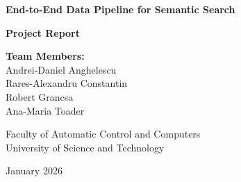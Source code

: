 \documentclass[12pt, a4paper]{article}
\begin{document}
\begin{titlepage}
    \centering
    \vspace*{1cm}
    
    \Huge
    \textbf{End-to-End Data Pipeline for Semantic Search}
    
    \vspace{2cm}
    
    \Large
    \textbf{Project Report}
    
    \vspace{2cm}
    
    \large
    \textbf{Team Members:} \\
    \vspace{0.5cm}
    Andrei-Daniel Anghelescu \\
    Rares-Alexandru Constantin \\
    Robert Grancsa \\
    Ana-Maria Toader
    
    \vfill
    
    \Large
    Faculty of Automatic Control and Computers \\
    University of Science and Technology \\
    
    \vspace{0.8cm}
    
    \Large
    January 2026
    
\end{titlepage}

\tableofcontents
\newpage
\end{document}
